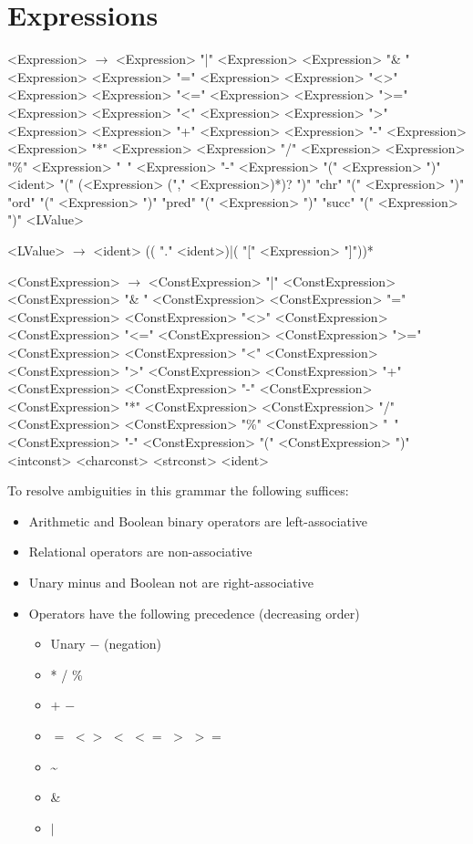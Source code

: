 \documentclass{book}
\begin{document}
\section{Expressions}
\begin{grammar}
<Expression> $\rightarrow$ <Expression> "|" <Expression>
\alt <Expression> "\& " <Expression>
\alt <Expression> "=" <Expression>
\alt <Expression> "<>" <Expression>
\alt <Expression> "<=" <Expression>
\alt <Expression> ">=" <Expression>
\alt <Expression> "<" <Expression>
\alt <Expression> ">" <Expression>
\alt <Expression> "+" <Expression>
\alt <Expression> "-" <Expression>
\alt <Expression> "*" <Expression>
\alt <Expression> "/" <Expression>
\alt <Expression> "\%" <Expression>
\alt "~" <Expression>
\alt "-" <Expression>
\alt "(" <Expression> ")"
\alt <ident> "(" (<Expression> ("," <Expression>)*)? ")"
\alt "chr" "(" <Expression> ")"
\alt "ord" "(" <Expression> ")"
\alt "pred" "(" <Expression> ")"
\alt "succ" "(" <Expression> ")"
\alt <LValue>

<LValue> $\rightarrow$ <ident> (( "." <ident>)|( "[" <Expression> "]"))*

<ConstExpression> $\rightarrow$ <ConstExpression> "|" <ConstExpression>
\alt <ConstExpression> "\& " <ConstExpression>
\alt <ConstExpression> "=" <ConstExpression>
\alt <ConstExpression> "<>" <ConstExpression>
\alt <ConstExpression> "<=" <ConstExpression>
\alt <ConstExpression> ">=" <ConstExpression>
\alt <ConstExpression> "<" <ConstExpression>
\alt <ConstExpression> ">" <ConstExpression>
\alt <ConstExpression> "+" <ConstExpression>
\alt <ConstExpression> "-" <ConstExpression>
\alt <ConstExpression> "*" <ConstExpression>
\alt <ConstExpression> "/" <ConstExpression>
\alt <ConstExpression> "\%" <ConstExpression>
\alt "~" <ConstExpression>
\alt "-" <ConstExpression>
\alt "(" <ConstExpression> ")"
\alt <intconst>
\alt <charconst>
\alt <strconst>
\alt <ident>

\end{grammar}
To resolve ambiguities in this grammar the following suffices:
\begin{itemize}
\item Arithmetic and Boolean binary operators are left-associative
\item Relational operators are non-associative
\item Unary minus and Boolean not are right-associative
\item Operators have the following precedence (decreasing order)
\begin{itemize}
\item Unary $-$ (negation)
\item * / \%
\item $+$ $-$
\item $=$ $<>$ $<$ $<=$ $>$ $>=$
\item \textasciitilde
\item \&
\item $|$
\end{itemize}
\end{itemize}
\end{document}
